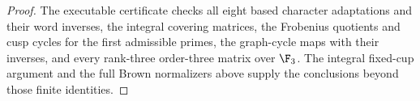 \begin{proof}
The executable certificate
checks all eight based character
adaptations and their word inverses,
the integral covering matrices,
the Frobenius quotients and cusp
cycles for the first admissible
primes, the graph-cycle maps with
their inverses, and every rank-three
order-three matrix over $\F_3$.
The integral fixed-cup argument
and the full Brown normalizers
above supply the conclusions
beyond those finite identities.
\end{proof}
